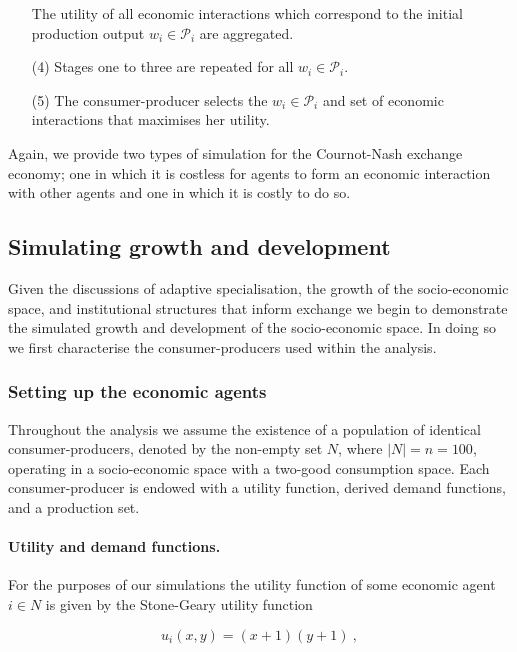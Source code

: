 \begin{algorithm}
\begin{itemize}
	    The utility of all economic interactions which correspond to the initial production output $w_{i} \in \mathcal{P}_{i}$ are aggregated.

	\item[(4)] Stages one to three are repeated for all $w_{i} \in \mathcal{P}_{i}$.

	\item[(5)] The consumer-producer selects the $w_{i} \in \mathcal{P}_{i}$ and set of economic interactions that maximises her utility.
\end{itemize}
\end{algorithm}

Again, we provide two types of simulation for the Cournot-Nash exchange economy; one in which it is costless for agents to form an economic interaction with other agents and one in which it is costly to do so.

\subsection{Simulating growth and development}

Given the discussions of adaptive specialisation, the growth of the socio-economic space, and institutional structures that inform exchange we begin to demonstrate the simulated growth and development of the socio-economic space. In doing so we first characterise the consumer-producers used within the analysis.

\subsubsection{Setting up the economic agents}

Throughout the analysis we assume the existence of a population of identical consumer-producers, denoted by the non-empty set $N$, where $|N|=n=100$, operating in a socio-economic space with a two-good consumption space. Each consumer-producer is endowed with a utility function, derived demand functions, and a production set.

\paragraph{Utility and demand functions.}

For the purposes of our simulations the utility function of some economic agent $i \in N$ is given by the Stone-Geary utility function

\begin{equation} \label{sim:utility}
u_{i}(x,y) = (x + 1)(y + 1)~,
\end{equation}


